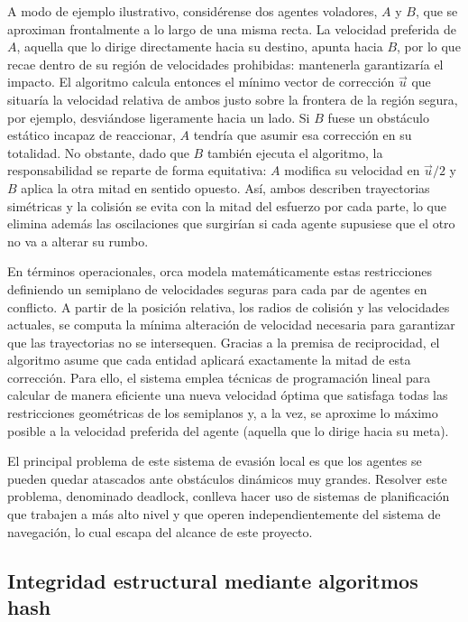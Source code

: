 A modo de ejemplo ilustrativo, considérense dos agentes voladores, $A$ y $B$, que se aproximan frontalmente a lo largo de una misma recta.
La velocidad preferida de $A$, aquella que lo dirige directamente hacia su destino, apunta hacia $B$, por lo que recae dentro de su región de velocidades prohibidas: mantenerla garantizaría el impacto.
El algoritmo calcula entonces el mínimo vector de corrección $\vec{u}$ que situaría la velocidad relativa de ambos justo sobre la frontera de la región segura, por ejemplo, desviándose ligeramente hacia un lado.
Si $B$ fuese un obstáculo estático incapaz de reaccionar, $A$ tendría que asumir esa corrección en su totalidad.
No obstante, dado que $B$ también ejecuta el algoritmo, la responsabilidad se reparte de forma equitativa: $A$ modifica su velocidad en $\vec{u}/2$ y $B$ aplica la otra mitad en sentido opuesto.
Así, ambos describen trayectorias simétricas y la colisión se evita con la mitad del esfuerzo por cada parte, lo que elimina además las oscilaciones que surgirían si cada agente supusiese que el otro no va a alterar su rumbo.

En términos operacionales, \acrshort{orca} modela matemáticamente estas restricciones definiendo un semiplano de velocidades seguras para cada par de agentes en conflicto.
A partir de la posición relativa, los radios de colisión y las velocidades actuales, se computa la mínima alteración de velocidad necesaria para garantizar que las trayectorias no se intersequen.
Gracias a la premisa de reciprocidad, el algoritmo asume que cada entidad aplicará exactamente la mitad de esta corrección.
Para ello, el sistema emplea técnicas de programación lineal para calcular de manera eficiente una nueva velocidad óptima que satisfaga todas las restricciones geométricas de los semiplanos y, a la vez, se aproxime lo máximo posible a la velocidad preferida del agente (aquella que lo dirige hacia su meta).

El principal problema de este sistema de evasión local es que los agentes se pueden quedar atascados ante obstáculos dinámicos muy grandes.
Resolver este problema, denominado \gls{deadlock}, conlleva hacer uso de sistemas de planificación que trabajen a más alto nivel y que operen independientemente del sistema de navegación, lo cual escapa del alcance de este proyecto.

\subsection{Integridad estructural mediante algoritmos hash}

